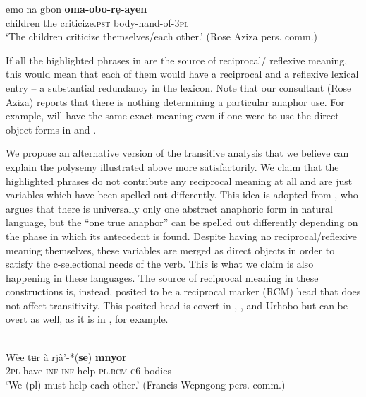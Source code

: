 \documentclass[output=paper]{langsci/langscibook}
\begin{document}
  \ex\label{ex:safir:5d}
  \gll emo    na    gbon     \textbf{oma-obo-rẹ-ayen} \\
	children  the  criticize.\textsc{pst}   body-hand-of-\textsc{3pl}\\
  \glt   ‘The children criticize themselves/each other.’ (Rose Aziza pers. comm.)
  \z
\z
 
If all the highlighted phrases in  are the source of reciprocal/ reflexive meaning, this would mean that each of them would have a reciprocal and a reflexive lexical entry – a substantial redundancy in the lexicon. Note that our consultant (Rose Aziza) reports that there is nothing determining a particular anaphor use. For example,  will have the same exact meaning even if one were to use the direct object forms in  and . 

We propose an alternative version of the transitive analysis that we believe can explain the polysemy illustrated above more satisfactorily. We claim that the highlighted phrases do not contribute any reciprocal meaning at all and are just variables which have been spelled out differently. This idea is adopted from \citet{Safir2014}, who argues that there is universally only one abstract anaphoric form in natural language, but the “one true anaphor” can be spelled out differently depending on the phase in which its antecedent is found. Despite having no reciprocal/reflexive meaning themselves, these variables are merged as direct objects in order to satisfy the c-selectional needs of the verb. This is what we claim is also happening in these  languages. The source of reciprocal meaning in these constructions is, instead, posited to be a reciprocal marker (RCM) head that does not affect transitivity. This posited head is covert in , ,  and Urhobo but can be overt as well, as it is in , for example.


\ea\label{ex:safir:6}
\\
\gll Wèe  tʉr  à  rjà’-*(\textbf{se})    \textbf{{mnyor}} \\
\textsc{2pl}  have  \textsc{inf}  \textsc{inf}-help-\textsc{pl.rcm}  \textsc{c}6-bodies \\
\glt ‘We (pl) must help each other.’ {(}Francis  Wepngong pers. comm.{)} 
\z
\end{document}
